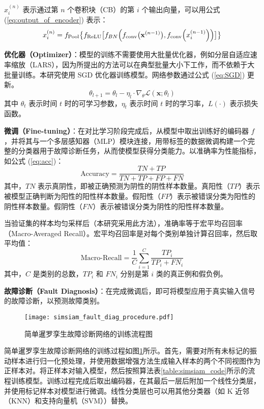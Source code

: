 \documentclass[master]{thesis-uestc}
\begin{document}
\( x_i^{(n)} \) 表示通过第 \( n \) 个卷积块（CB）的第 \( i \) 个输出向量，可以用公式 (\ref{eq:output_of_encoder}) 表示：
\begin{equation}
    \begin{aligned}
    x_i^{(n)} = f_{\text{Pool}}\bigl\{f_{\text{ReLU}}\bigl[f_{BN}\Bigl(f_{\text{conv}}\bigl(\mathbf{x}^{(n-1)}\bigr), f_{\text{conv}}\Bigl(x_i^{(n-1)}\Bigr)\Bigr)\bigr]\bigr\}
    \end{aligned}
    \label{eq:output_of_encoder}
\end{equation}

\textbf{优化器（Optimizer）}：模型的训练不需要使用大批量优化器，例如分层自适应速率缩放（LARS），因为所提出的方法可以在典型批量大小下工作，而不依赖于大批量训练。本研究使用 SGD 优化器训练模型。网络参数通过公式 (\ref{eq:SGD}) 更新。
\begin{equation}
    \theta_{l+1} = \theta_l - \eta_l \cdot \nabla_{\theta} \mathcal{L}(\mathbf{x}; \theta_l)
\label{eq:SGD}
\end{equation}
其中 \( \theta_t \) 表示时间 \( t \) 时的可学习参数，\( \eta_t \) 表示时间 \( t \) 时的学习率，\( L(\cdot) \) 表示损失函数。

\textbf{微调（Fine-tuning）}：在对比学习阶段完成后，从模型中取出训练好的编码器 \( f \)，并将其与一个多层感知器（MLP）模块连接，用带标签的数据微调构建一个完整的分类器用于故障诊断任务，从而使模型获得分类能力。以准确率为性能指标，如公式 (\ref{eq:acc})：
\begin{equation}
    \text{Accuracy} = \frac{TN + TP}{TN + TP + FP + FN}
    \label{eq:acc}
\end{equation}
其中，\( TN \) 表示真阴性，即被正确预测为阴性的阴性样本数量。真阳性（\( TP \)）表示被模型正确判断为阳性的阳性样本数量。假阳性（\( FP \)）表示被错误分类为阳性的阴性样本数量。假阴性（\( FN \)）表示被错误分类为阴性的阳性样本数量。  

当验证集的样本均匀采样后（本研究采用此方法），准确率等于宏平均召回率（Macro-Averaged Recall）。宏平均召回率是对每个类别单独计算召回率，然后取平均值：
\begin{equation}
    \text{Macro-Recall} = \frac{1}{C} \sum_{i=1}^{C} \frac{TP_i}{TP_i + FN_i}
    \label{eq:macro_recall}
\end{equation}
其中，\( C \) 是类别的总数，\( TP_i \) 和 \( FN_i \) 分别是第 \( i \) 类的真正例和假负例。

\textbf{故障诊断（Fault Diagnosis）}：在完成微调后，即可将模型应用于真实输入信号的故障诊断，以预测故障类别。
\begin{figure}[h]
    \centering
    \texttt{[image: simsiam\_fault\_diag\_procedure.pdf]}
    \caption{简单暹罗孪生故障诊断网络的训练流程图}
    \label{simsiam_fault_diag_procedure}
\end{figure}
简单暹罗孪生故障诊断网络的训练过程如图\ref{simsiam_fault_diag_procedure}所示。首先，需要对所有未标记的振动样本进行归一化预处理，并使用数据增强方法生成输入样本的两个不同视图作为正样本对。将正样本对输入模型，然后按照算法表\ref{table:simsiam_code}所示的流程训练模型。训练过程完成后取出编码器，在其最后一层后附加一个线性分类层，并使用标记样本对模型进行微调。线性分类层也可以用其他分类器（如 K 近邻（KNN）和支持向量机（SVM））替换。
\end{document}
